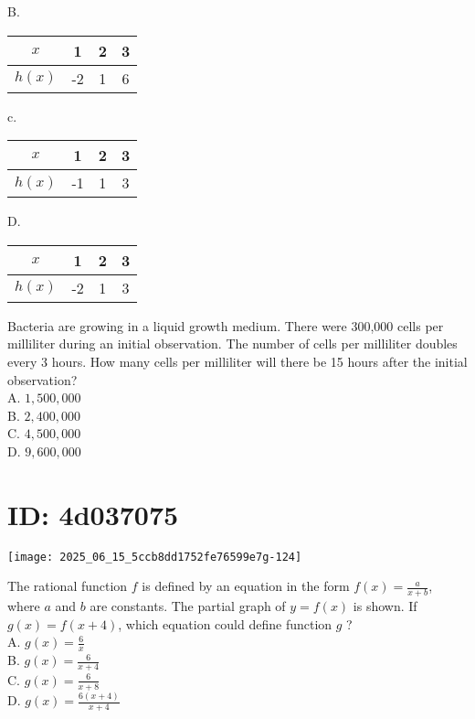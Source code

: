 B.

\begin{center}
\begin{tabular}{|c|c|c|c|}
\hline
$x$ & 1 & 2 & 3 \\
\hline
$h(x)$ & -2 & 1 & 6 \\
\hline
\end{tabular}
\end{center}

c.

\begin{center}
\begin{tabular}{|c|c|c|c|}
\hline
$x$ & 1 & 2 & 3 \\
\hline
$h(x)$ & -1 & 1 & 3 \\
\hline
\end{tabular}
\end{center}

D.

\begin{center}
\begin{tabular}{|c|c|c|c|}
\hline
$x$ & 1 & 2 & 3 \\
\hline
$h(x)$ & -2 & 1 & 3 \\
\hline
\end{tabular}
\end{center}

Bacteria are growing in a liquid growth medium. There were 300,000 cells per milliliter during an initial observation. The number of cells per milliliter doubles every 3 hours. How many cells per milliliter will there be 15 hours after the initial observation?\\
A. $1,500,000$\\
B. $2,400,000$\\
C. $4,500,000$\\
D. $9,600,000$

\section*{ID: 4d037075}
\begin{center}
\texttt{[image: 2025\_06\_15\_5ccb8dd1752fe76599e7g-124]}
\end{center}

The rational function $f$ is defined by an equation in the form $f(x)=\frac{a}{x+b}$, where $a$ and $b$ are constants. The partial graph of $y=f(x)$ is shown. If $g(x)=f(x+4)$, which equation could define function $g$ ?\\
A. $g(x)=\frac{6}{x}$\\
B. $g(x)=\frac{6}{x+4}$\\
C. $g(x)=\frac{6}{x+8}$\\
D. $g(x)=\frac{6(x+4)}{x+4}$

